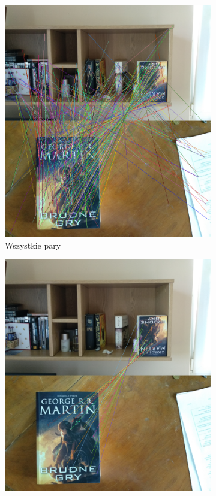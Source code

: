 \documentclass{article}
\begin{document}
	\begin{figure}[H]
		\centering
		\begin{subfigure}[b]{0.4\linewidth}
			\includegraphics[width=\linewidth]{k2a.png}
			\caption{Wszystkie pary}
		\end{subfigure}
		\begin{subfigure}[b]{0.4\linewidth}
			\includegraphics[width=\linewidth]{k2c.png}

\end{subfigure}
\end{figure}
\end{document}
